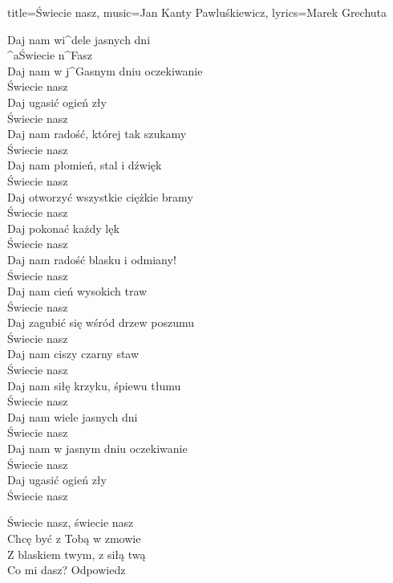 \begin{song}{title={Świecie nasz}, music={Jan Kanty Pawluśkiewicz}, lyrics={Marek Grechuta}}
\begin{multicols}{2}
\begin{chorus}
		Daj nam wi^{d}ele jasnych dni \\
		^{a}Świecie n^{F}asz \\ 
		Daj nam w j^{G}asnym dniu oczekiwanie \\
		Świecie nasz \\ 
		Daj ugasić ogień zły \\
		Świecie nasz \\
		Daj nam radość, której tak szukamy \\
		Świecie nasz \\
		Daj nam płomień, stal i dźwięk \\
		Świecie nasz \\
		Daj otworzyć wszystkie ciężkie bramy \\
		Świecie nasz \\ 
		Daj pokonać każdy lęk \\
		Świecie nasz \\
		Daj nam radość blasku i odmiany! \\
		Świecie nasz \\
		Daj nam cień wysokich traw \\
		Świecie nasz \\
		Daj zagubić się wśród drzew poszumu \\
		Świecie nasz \\
		Daj nam ciszy czarny staw \\
		Świecie nasz \\
		Daj nam siłę krzyku, śpiewu tłumu \\
		Świecie nasz \\ 
		Daj nam wiele jasnych dni \\
		Świecie nasz \\
		Daj nam w jasnym dniu oczekiwanie \\
		Świecie nasz \\
		Daj ugasić ogień zły \\
		Świecie nasz
    \end{chorus}
    \begin{interlude}
    	Świecie nasz, świecie nasz \\
		Chcę być z Tobą w zmowie \\
		Z blaskiem twym, z siłą twą \\
		Co mi dasz? Odpowiedz
    \end{interlude}
\end{multicols}
\end{song}
\newpage
